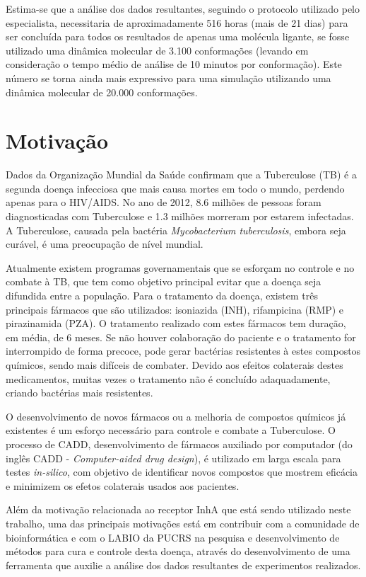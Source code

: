 Estima-se que a análise dos dados resultantes, seguindo o protocolo utilizado pelo especialista, necessitaria de aproximadamente 516 horas (mais de 21 dias) para ser concluída para todos os resultados de apenas uma molécula ligante, se fosse utilizado uma dinâmica molecular de 3.100 conformações (levando em consideração o tempo médio de análise de 10 minutos por conformação). Este número se torna ainda mais expressivo para uma simulação utilizando uma dinâmica molecular de 20.000 conformações.


\section{Motivação}

Dados da Organização Mundial da Saúde confirmam que a Tuberculose (TB) é a segunda doença infecciosa que mais causa mortes em todo o mundo, perdendo apenas para o HIV/AIDS. No ano de 2012, 8.6 milhões de pessoas foram diagnosticadas com Tuberculose e 1.3 milhões morreram por estarem infectadas. A Tuberculose, causada pela bactéria \emph{Mycobacterium tuberculosis}, embora seja curável, é uma preocupação de nível mundial.

Atualmente existem programas governamentais que se esforçam no controle e no combate à TB, que tem como objetivo principal evitar que a doença seja difundida entre a população. Para o tratamento da doença, existem três principais fármacos que são utilizados: isoniazida (INH), rifampicina (RMP) e pirazinamida (PZA). O tratamento realizado com estes fármacos tem duração, em média, de 6 meses. Se não houver colaboração do paciente e o tratamento for interrompido de forma precoce, pode gerar bactérias resistentes à estes compostos químicos, sendo mais difíceis de combater. Devido aos efeitos colaterais destes medicamentos, muitas vezes o tratamento não é concluído adaquadamente, criando bactérias mais resistentes.

O desenvolvimento de novos fármacos ou a melhoria de compostos químicos já existentes é um esforço necessário para controle e combate a Tuberculose. O processo de CADD, desenvolvimento de fármacos auxiliado por computador (do inglês CADD - \emph{Computer-aided drug design}), é utilizado em larga escala para testes \emph{in-silico}, com objetivo de identificar novos compostos que mostrem eficácia e minimizem os efetos colaterais usados aos pacientes.

Além da motivação relacionada ao receptor InhA que está sendo utilizado neste trabalho, uma das principais motivações está em contribuir com a comunidade de bioinformática e com o LABIO da PUCRS na pesquisa e desenvolvimento de métodos para cura e controle desta doença, através do desenvolvimento de uma ferramenta que auxilie a análise dos dados resultantes de experimentos realizados. 


